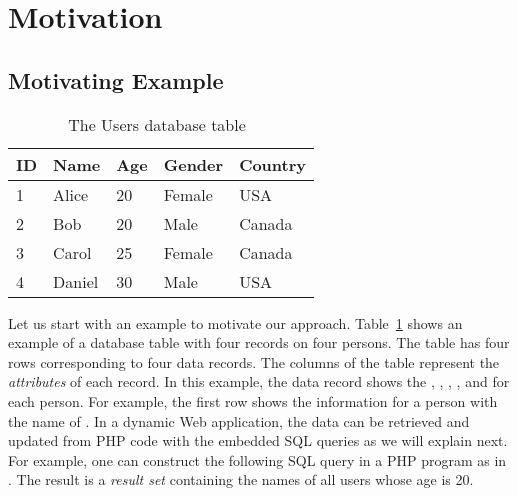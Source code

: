 \section{Motivation}

\subsection{Motivating Example}

\begin{table}
    \centering
    \small
    \caption{The \textsf{Users} database table~\cite{icsm13}}\label{tab:users-table}
\begin{tabular}{lllll}
  \addlinespace
  \toprule
  \textbf{ID} & \textbf{Name} & \textbf{Age} & \textbf{Gender} & \textbf{Country} \\
  \midrule
  1 & Alice & 20 & Female & USA \\
  2 & Bob & 20 & Male & Canada \\
  3 & Carol & 25 & Female & Canada \\
  4 & Daniel & 30 & Male & USA \\
  \bottomrule
\end{tabular}
\end{table}

Let us start with an example to motivate our
approach. Table~\ref{tab:users-table} shows an example of a database
table with four records on four persons. The table  has
four rows corresponding to four data records. The columns of the table
represent the {\em attributes} of each record. In this example, the
data record shows the , , ,
, and  for each person. For example, the
first row shows the information for a person with the name of
. In a dynamic Web application, the data can be retrieved
and updated from PHP code with the embedded SQL queries as we will
explain next. For example, one can construct the following SQL query
in a PHP program as in . The result is a {\em result set} containing the names of all
users whose age is 20.


